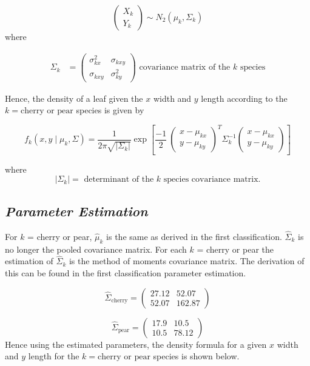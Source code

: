 \documentclass[]{article}
\begin{document}
\[\left(\begin{matrix}X_k \\ Y_k \end{matrix} \right) \sim N_2 \left(\mu_{k}, \Sigma_k \right)\]
where

\begin{align*}
  \Sigma_k &= \left(\begin{matrix} \sigma^2_{kx} &\sigma_{kxy} \\ \sigma_{kxy} &\sigma^2_{ky} \end{matrix} \right) \text{ covariance matrix of the $k$ species}
  \end{align*}

Hence, the density of a leaf given the \(x\) width and \(y\) length
according to the \(k = \text{cherry or pear}\) species is given by

\[f_k(x,y \mid \mu_k, \Sigma) = \frac{1}{2\pi\sqrt{|\Sigma_k|}} \exp\left[\frac{-1}{2}\ \left(\begin{matrix}x-\mu_{kx} \\ y-\mu_{ky} \end{matrix}\right)^T \Sigma^{-1}_k \left(\begin{matrix}x-\mu_{kx} \\ y-\mu_{ky} \end{matrix}\right) \right] \]

where
\[|\Sigma_k| = \text{ determinant of the $k$ species covariance matrix}.\]

\subsection{\normalsize{\textit{Parameter Estimation}}}

For \(k\) = cherry or pear, \(\hat{\mu}_k\) is the same as derived in
the first classification. \(\hat{\Sigma}_{k}\) is no longer the pooled
covariance matrix. For each \(k\) = cherry or pear the estimation of
\(\hat{\Sigma}_k\) is the method of moments covariance matrix. The
derivation of this can be found in the first classification parameter
estimation.

\[\hat{\Sigma}_{\text{cherry}} = \left( \begin{matrix}27.12 &52.07 \\ 52.07  & 162.87\end{matrix}\right) \]

\[\hat{\Sigma}_{\text{pear}} = \left( \begin{matrix}17.9 &10.5 \\ 10.5  & 78.12\end{matrix}\right) \]
Hence using the estimated parameters, the density formula for a given
\(x\) width and \(y\) length for the \(k=\text{cherry or pear}\) species
is shown below.
\end{document}
